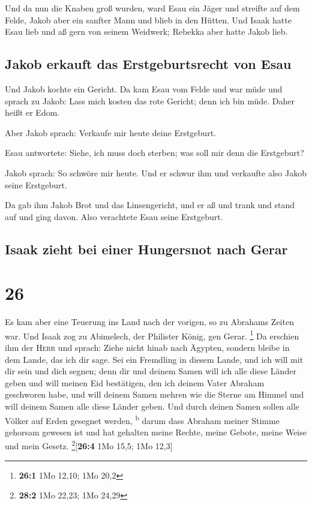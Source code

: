  Und da nun die Knaben groß wurden, ward Esau ein Jäger
und streifte auf dem Felde, Jakob aber ein sanfter Mann und blieb in den
Hütten.  Und Isaak hatte Esau lieb und aß gern von seinem
Weidwerk; Rebekka aber hatte Jakob lieb.

\hypertarget{jakob-erkauft-das-erstgeburtsrecht-von-esau}{%
\subsection{Jakob erkauft das Erstgeburtsrecht von
Esau}\label{jakob-erkauft-das-erstgeburtsrecht-von-esau}}

 Und Jakob kochte ein Gericht. Da kam Esau vom Felde und
war müde  und sprach zu Jakob: Lass mich kosten das rote
Gericht; denn ich bin müde. Daher heißt er Edom.

 Aber Jakob sprach: Verkaufe mir heute deine Erstgeburt.

 Esau antwortete: Siehe, ich muss doch sterben; was soll
mir denn die Erstgeburt?

 Jakob sprach: So schwöre mir heute. Und er schwur ihm
und verkaufte also Jakob seine Erstgeburt.

 Da gab ihm Jakob Brot und das Linsengericht, und er aß
und trank und stand auf und ging davon. Also verachtete Esau seine
Erstgeburt.

\hypertarget{isaak-zieht-bei-einer-hungersnot-nach-gerar}{%
\subsection{Isaak zieht bei einer Hungersnot nach
Gerar}\label{isaak-zieht-bei-einer-hungersnot-nach-gerar}}

\hypertarget{section-25}{%
\section{26}\label{section-25}}

 Es kam aber eine Teuerung ins Land nach der vorigen, so
zu Abrahams Zeiten war. Und Isaak zog zu Abimelech, der Philister König,
gen Gerar. \footnote{\textbf{26:1} 1Mo 12,10; 1Mo 20,2} 
Da erschien ihm der \textsc{Herr} und sprach: Ziehe nicht hinab nach
Ägypten, sondern bleibe in dem Lande, das ich dir sage. 
Sei ein Fremdling in diesem Lande, und ich will mit dir sein und dich
segnen; denn dir und deinem Samen will ich alle diese Länder geben und
will meinen Eid bestätigen, den ich deinem Vater Abraham geschworen
habe,  und will deinem Samen mehren wie die Sterne am
Himmel und will deinem Samen alle diese Länder geben. Und durch deinen
Samen sollen alle Völker auf Erden gesegnet werden, \textsuperscript{b}
 darum dass Abraham meiner Stimme gehorsam gewesen ist und
hat gehalten meine Rechte, meine Gebote, meine Weise und mein Gesetz.
\footnote{\textbf{28:2} 1Mo 22,23; 1Mo 24,29}{[}\textbf{26:4} 1Mo 15,5;
1Mo 12,3{]}

